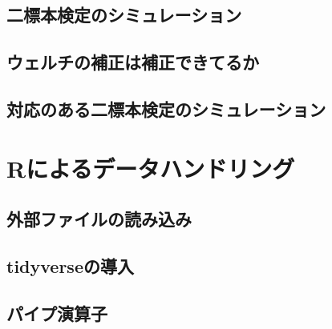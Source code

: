 \documentclass[
  a4paper,
]{ltjsbook}
\begin{document}
\hypertarget{ux4e8cux6a19ux672cux691cux5b9aux306eux30b7ux30dfux30e5ux30ecux30fcux30b7ux30e7ux30f3}{%
\section{二標本検定のシミュレーション}\label{ux4e8cux6a19ux672cux691cux5b9aux306eux30b7ux30dfux30e5ux30ecux30fcux30b7ux30e7ux30f3}}

\hypertarget{ux30a6ux30a7ux30ebux30c1ux306eux88dcux6b63ux306fux88dcux6b63ux3067ux304dux3066ux308bux304b}{%
\section{ウェルチの補正は補正できてるか}\label{ux30a6ux30a7ux30ebux30c1ux306eux88dcux6b63ux306fux88dcux6b63ux3067ux304dux3066ux308bux304b}}

\hypertarget{ux5bfeux5fdcux306eux3042ux308bux4e8cux6a19ux672cux691cux5b9aux306eux30b7ux30dfux30e5ux30ecux30fcux30b7ux30e7ux30f3}{%
\section{対応のある二標本検定のシミュレーション}\label{ux5bfeux5fdcux306eux3042ux308bux4e8cux6a19ux672cux691cux5b9aux306eux30b7ux30dfux30e5ux30ecux30fcux30b7ux30e7ux30f3}}


\hypertarget{rux306bux3088ux308bux30c7ux30fcux30bfux30cfux30f3ux30c9ux30eaux30f3ux30b0-1}{%
\chapter{Rによるデータハンドリング}\label{rux306bux3088ux308bux30c7ux30fcux30bfux30cfux30f3ux30c9ux30eaux30f3ux30b0-1}}

\hypertarget{ux5916ux90e8ux30d5ux30a1ux30a4ux30ebux306eux8aadux307fux8fbcux307f-1}{%
\section{外部ファイルの読み込み}\label{ux5916ux90e8ux30d5ux30a1ux30a4ux30ebux306eux8aadux307fux8fbcux307f-1}}

\hypertarget{tidyverseux306eux5c0eux5165-1}{%
\section{tidyverseの導入}\label{tidyverseux306eux5c0eux5165-1}}

\hypertarget{ux30d1ux30a4ux30d7ux6f14ux7b97ux5b50-1}{%
\section{パイプ演算子}\label{ux30d1ux30a4ux30d7ux6f14ux7b97ux5b50-1}}
\end{document}
